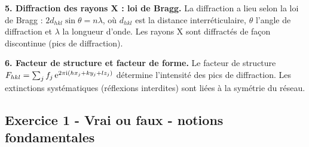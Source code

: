 \documentclass[12pt,a4paper]{article}
\begin{document}
\begin{boiteresume}
\textbf{5. Diffraction des rayons X : loi de Bragg.}
La diffraction a lieu selon la loi de Bragg : $2d_{hkl}\sin\theta = n\lambda$, où $d_{hkl}$ est la distance interréticulaire, $\theta$ l'angle de diffraction et $\lambda$ la longueur d'onde. Les rayons X sont diffractés de façon discontinue (pics de diffraction).

\textbf{6. Facteur de structure et facteur de forme.}
Le facteur de structure $F_{hkl} = \sum_j f_j\,\mathrm{e}^{2\pi\mathrm{i}(hx_j+ky_j+lz_j)}$ détermine l'intensité des pics de diffraction. Les extinctions systématiques (réflexions interdites) sont liées à la symétrie du réseau.

\end{boiteresume}

\newpage
\subsection*{Exercice 1 - Vrai ou faux - notions fondamentales \niveau{\facile}}
\end{document}
